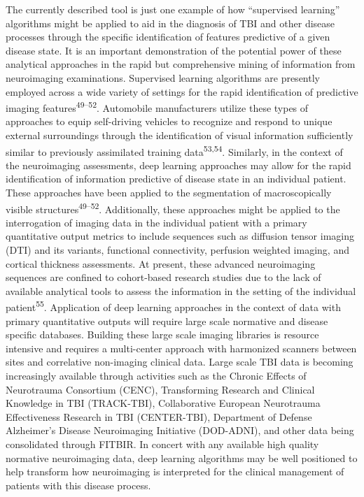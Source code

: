 \documentclass[11pt,]{article}
\begin{document}
The currently described tool is just one example of how ``supervised
learning'' algorithms might be applied to aid in the diagnosis of TBI
and other disease processes through the specific identification of
features predictive of a given disease state. It is an important
demonstration of the potential power of these analytical approaches in
the rapid but comprehensive mining of information from neuroimaging
examinations. Supervised learning algorithms are presently employed
across a wide variety of settings for the rapid identification of
predictive imaging features\textsuperscript{49--52}. Automobile
manufacturers utilize these types of approaches to equip self-driving
vehicles to recognize and respond to unique external surroundings
through the identification of visual information sufficiently similar to
previously assimilated training data\textsuperscript{53,54}. Similarly,
in the context of the neuroimaging assessments, deep learning approaches
may allow for the rapid identification of information predictive of
disease state in an individual patient. These approaches have been
applied to the segmentation of macroscopically visible
structures\textsuperscript{49--52}. Additionally, these approaches might
be applied to the interrogation of imaging data in the individual
patient with a primary quantitative output metrics to include sequences
such as diffusion tensor imaging (DTI) and its variants, functional
connectivity, perfusion weighted imaging, and cortical thickness
assessments. At present, these advanced neuroimaging sequences are
confined to cohort-based research studies due to the lack of available
analytical tools to assess the information in the setting of the
individual patient\textsuperscript{55}. Application of deep learning
approaches in the context of data with primary quantitative outputs will
require large scale normative and disease specific databases. Building
these large scale imaging libraries is resource intensive and requires a
multi-center approach with harmonized scanners between sites and
correlative non-imaging clinical data. Large scale TBI data is becoming
increasingly available through activities such as the Chronic Effects of
Neurotrauma Consortium (CENC), Transforming Research and Clinical
Knowledge in TBI (TRACK-TBI), Collaborative European Neurotrauma
Effectiveness Research in TBI (CENTER-TBI), Department of Defense
Alzheimer's Disease Neuroimaging Initiative (DOD-ADNI), and other data
being consolidated through FITBIR. In concert with any available high
quality normative neuroimaging data, deep learning algorithms may be
well positioned to help transform how neuroimaging is interpreted for
the clinical management of patients with this disease process.
\end{document}
